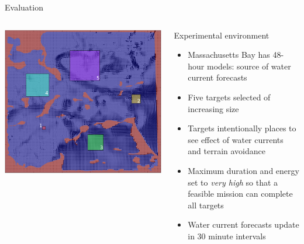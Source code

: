 \documentclass[9pt]{beamer}
\begin{document}
\begin{frame}{Evaluation}
    \begin{columns}
        \begin{column}{0.5\textwidth}
            \begin{center}
                \includegraphics[width=\textwidth,trim={0cm 1cm 0cm 1.75cm},clip]{img/CurrentsTargetMap.png}
            \end{center}
        \end{column}
        \begin{column}{0.5\textwidth}
            \begin{block}{Experimental environment}
        	    \begin{itemize}
        	        \item Massachusetts Bay has 48-hour models: source of water current forecasts
        	        \item Five targets selected of increasing size
        	        \item Targets intentionally places to see effect of water currents and terrain avoidance
        	        \item Maximum duration and energy set to \textit{very high} so that a feasible mission can complete all targets
        	        \item Water current forecasts update in 30 minute intervals
                \end{itemize}
            \end{block}
        \end{column}
    \end{columns}
\end{frame}
\end{document}
